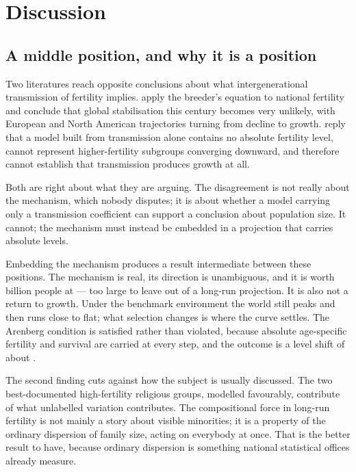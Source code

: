 \section{Discussion}
\label{sec:discussion}

\subsection{A middle position, and why it is a position}

Two literatures reach opposite conclusions about what intergenerational
transmission of fertility implies. \citet{collins2019} apply the breeder's
equation to national fertility and conclude that global stabilisation this
century becomes very unlikely, with European and North American trajectories
turning from decline to growth. \citet{arenberg2022} reply that a model built
from transmission alone contains no absolute fertility level, cannot represent
higher-fertility subgroups converging downward, and therefore cannot establish
that transmission produces growth at all.

Both are right about what they are arguing. The disagreement is not really about
the mechanism, which nobody disputes; it is about whether a model carrying only a
transmission coefficient can support a conclusion about population size. It
cannot; the mechanism must instead be embedded in a projection that carries
absolute levels.

Embedding the mechanism produces a result intermediate between these positions. The
mechanism is real, its direction is unambiguous, and it is worth
\LadderMainstreamGain{} billion people at \ProjectionEndYear{} --- too large to
leave out of a long-run projection. It is also not a return to growth. Under the
benchmark environment the world still peaks and then runs close to flat; what
selection changes is where the curve settles. The Arenberg condition is satisfied
rather than violated, because absolute age-specific fertility and survival are
carried at every step, and the outcome is a level shift of about
\LadderMainstreamGainPercent{}.

The second finding cuts against how the subject is usually discussed. The two
best-documented high-fertility religious groups, modelled favourably, contribute
\NamedGroupShareOfMechanism{} of what unlabelled variation contributes. The
compositional force in long-run fertility is not mainly a story about visible
minorities; it is a property of the ordinary dispersion of family size, acting on
everybody at once. That is the better result to have, because ordinary dispersion
is something national statistical offices already measure.

